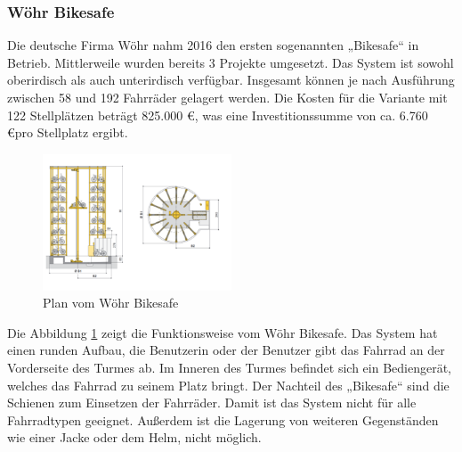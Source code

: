 \subsubsection{Wöhr Bikesafe}
Die deutsche Firma Wöhr nahm 2016 den ersten sogenannten „Bikesafe“ in Betrieb.  Mittlerweile wurden bereits 3 Projekte umgesetzt.  Das System ist sowohl oberirdisch als auch unterirdisch verfügbar. Insgesamt können je nach Ausführung zwischen 58 und 192 Fahrräder gelagert werden. Die Kosten für die Variante mit 122 Stellplätzen beträgt 825.000 \euro, was eine Investitionssumme von ca. 6.760 \euro pro Stellplatz ergibt.\cite*{richtpreisangebot}

\begin{figure}[H]
  \centering
  \includegraphics[width=0.5\textwidth]{images/bikesafe.png}
  \caption{Plan vom Wöhr Bikesafe }
  \label{fig:bikesafe}
\end{figure}

Die Abbildung \ref{fig:bikesafe} zeigt die Funktionsweise vom Wöhr Bikesafe. Das System hat einen runden Aufbau, die Benutzerin oder der Benutzer gibt das Fahrrad an der Vorderseite des Turmes ab. Im Inneren des Turmes befindet sich ein Bediengerät, welches das Fahrrad zu seinem Platz bringt.
\noindent Der Nachteil des „Bikesafe“ sind die Schienen zum Einsetzen der Fahrräder. Damit ist das System nicht für alle Fahrradtypen geeignet. Außerdem ist die Lagerung von weiteren Gegenständen wie einer Jacke oder dem Helm, nicht möglich.
